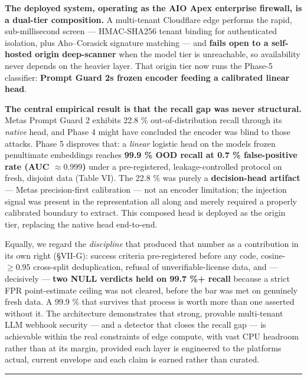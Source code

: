 \textbf{The deployed system, operating as the AIO Apex enterprise
firewall, is a dual-tier composition.} A multi-tenant Cloudflare edge
performs the rapid, sub-millisecond screen --- HMAC-SHA256 tenant
binding for authenticated isolation, plus Aho--Corasick signature
matching --- and \textbf{fails open to a self-hosted origin
deep-scanner} when the model tier is unreachable, so availability never
depends on the heavier layer. That origin tier now runs the Phase-5
classifier: \textbf{Prompt Guard 2\textquotesingle s frozen encoder
feeding a calibrated linear head}.

\textbf{The central empirical result is that the recall gap was never
structural.} Meta\textquotesingle s Prompt Guard 2 exhibits 22.8 \%
out-of-distribution recall through its \emph{native} head, and Phase 4
might have concluded the encoder was blind to those attacks. Phase 5
disproves that: a \emph{linear} logistic head on the
model\textquotesingle s frozen penultimate embeddings reaches
\textbf{99.9 \% OOD recall at 0.7 \% false-positive rate (AUC
\(\approx 0.999\))} under a pre-registered, leakage-controlled protocol
on fresh, disjoint data (Table VI). The 22.8 \% was purely a
\textbf{decision-head artifact} --- Meta\textquotesingle s
precision-first calibration --- not an encoder limitation; the injection
signal was present in the representation all along and merely required a
properly calibrated boundary to extract. This composed head is deployed
as the origin tier, replacing the native head end-to-end.

Equally, we regard the \emph{discipline} that produced that number as a
contribution in its own right (§VII-G): success criteria pre-registered
before any code, cosine-\(\ge 0.95\) cross-split deduplication, refusal
of unverifiable-license data, and --- decisively --- \textbf{two NULL
verdicts held on 99.7 \%+ recall} because a strict FPR point-estimate
ceiling was not cleared, before the bar was met on genuinely fresh data.
A 99.9 \% that survives that process is worth more than one asserted
without it. The architecture demonstrates that strong, provable
multi-tenant LLM webhook security --- and a detector that closes the
recall gap --- is achievable within the real constraints of edge
compute, with vast CPU headroom rather than at its margin, provided each
layer is engineered to the platform\textquotesingle s actual, current
envelope and each claim is earned rather than curated.

\begin{center}\rule{0.5\linewidth}{0.5pt}\end{center}

